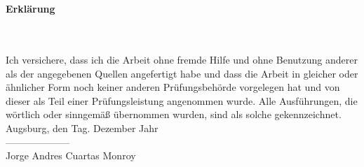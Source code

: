 

\section*{}
\vfill
\begin{huge}
\textbf{Erklärung}
\end{huge}
\\\\
Ich versichere, dass ich die Arbeit ohne fremde Hilfe und ohne Benutzung
anderer  als der angegebenen Quellen angefertigt habe und dass die Arbeit in 
gleicher oder ähnlicher Form noch keiner anderen Prüfungsbehörde vorgelegen hat
und von dieser als Teil einer Prüfungsleistung angenommen wurde. Alle 
Ausführungen, die wörtlich oder sinngemäß übernommen wurden, sind als solche 
gekennzeichnet.\\


\noindent Augsburg, den Tag. Dezember Jahr\\


--------------------\\
Jorge Andres Cuartas Monroy
\vfill